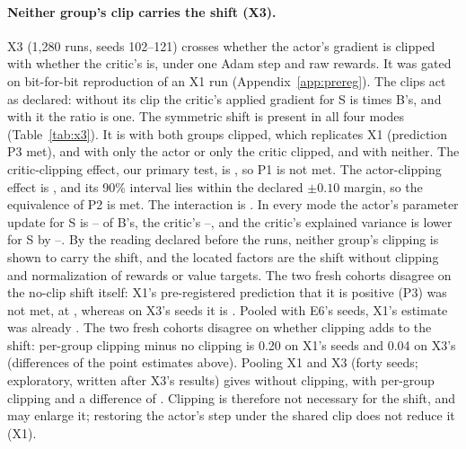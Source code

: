 \paragraph{Neither group's clip carries the shift (X3).}
X3 (1,280 runs, seeds 102--121) crosses whether the actor's gradient is clipped with whether the critic's is, under
one Adam step and raw rewards. It was gated on bit-for-bit reproduction of an X1 run (Appendix~\ref{app:prereg}). The
clips act as declared: without its clip the critic's applied gradient for S is \VxtCritGradNone{} times B's, and with
it the ratio is one. The symmetric shift is present in all four modes (Table~\ref{tab:x3}). It is \VxtBoth{} with both
groups clipped, which replicates X1 (prediction P3 met), \VxtActor{} and \VxtCritic{} with only the actor or only the
critic clipped, and \VxtNeither{} with neither. The critic-clipping effect, our primary test, is \VxtCEff{}, so P1 is
not met. The actor-clipping effect is \VxtAEff{}, and its 90\% interval \VxtAEffNinety{} lies within the declared
$\pm0.10$ margin, so the equivalence of P2 is met. The interaction is \VxtInt{}. In every mode the actor's parameter
update for S is \VxtActUpdLo{}--\VxtActUpdHi{} of B's, the critic's \VxtCritUpdLo{}--\VxtCritUpdHi{}, and the critic's
explained variance is lower for S by \VxtEVLo{}--\VxtEVHi{}. By the reading declared before the runs, neither group's
clipping is shown to carry the shift, and the located factors are the shift without clipping and normalization of
rewards or value targets. The two fresh cohorts disagree on the no-clip shift itself: X1's pre-registered prediction
that it is positive (P3) was not met, at \VxFNone{}, whereas on X3's seeds it is \VxtNeither{}. Pooled with E6's seeds, X1's estimate was already
\VxPNone{}. The two fresh cohorts disagree on whether clipping adds to the shift: per-group clipping minus no clipping is
0.20 on X1's seeds and 0.04 on X3's (differences of the point estimates above). Pooling X1 and X3 (forty seeds; exploratory, written after X3's
results) gives \VxeNone{} without clipping, \VxeGroup{} with per-group clipping and a difference of \VxeDiff{}. Clipping is
therefore not necessary for the shift, and may enlarge it; restoring the actor's step under the shared clip does not
reduce it (X1).




